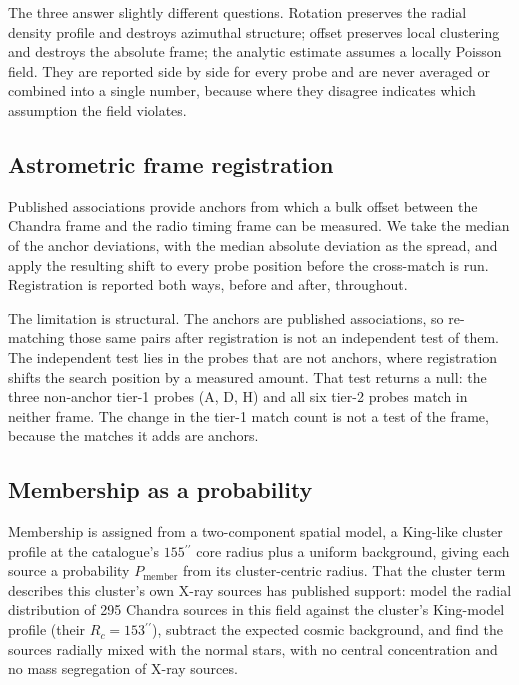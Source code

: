 \documentclass[11pt]{article}
\newcommand{\as}{\ensuremath{^{\prime\prime}}}
\begin{document}
The three answer slightly different questions. Rotation preserves the radial density profile and destroys azimuthal structure; offset preserves local clustering and destroys the absolute frame; the analytic estimate assumes a locally Poisson field. They are reported side by side for every probe and are never averaged or combined into a single number, because where they disagree indicates which assumption the field violates.

\subsection{Astrometric frame registration}
\label{sec:method-frame}

Published associations provide anchors from which a bulk offset between the Chandra frame and the radio timing frame can be measured. We take the median of the anchor deviations, with the median absolute deviation as the spread, and apply the resulting shift to every probe position before the cross-match is run. Registration is reported both ways, before and after, throughout.

The limitation is structural. The anchors are published associations, so re-matching those same pairs after registration is not an independent test of them. The independent test lies in the probes that are not anchors, where registration shifts the search position by a measured amount. That test returns a null: the three non-anchor tier-1 probes (A, D, H) and all six tier-2 probes match in neither frame. The change in the tier-1 match count is not a test of the frame, because the matches it adds are anchors.

\subsection{Membership as a probability}
\label{sec:method-membership}

Membership is assigned from a two-component spatial model, a King-like cluster profile at the catalogue's $155\as$ core radius plus a uniform background, giving each source a probability $P_{\mathrm{member}}$ from its cluster-centric radius. That the cluster term describes this cluster's own X-ray sources has published support: \citet{Cheng2020} model the radial distribution of 295 Chandra sources in this field against the cluster's King-model profile (their $R_c = 153\as$), subtract the expected cosmic background, and find the sources radially mixed with the normal stars, with no central concentration and no mass segregation of X-ray sources.
\end{document}
